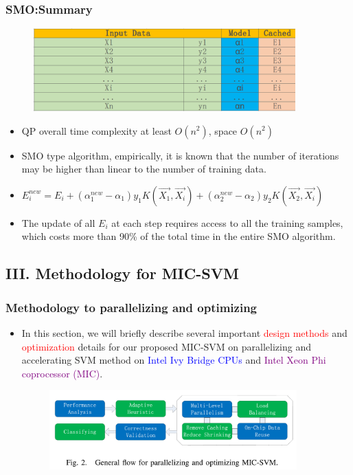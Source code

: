 \documentclass{beamer}
\begin{document}
\begin{frame}
	\frametitle{SMO:Summary}	
	\begin{figure}
		\includegraphics[width=0.9\textwidth]{figs/smo_datastructure.png}
		
	\end{figure} 
	\begin{itemize}
		\item QP overall time complexity at least $O(n^{2})$, space $O(n^{2})$
		\item SMO type algorithm, empirically, it is known that the number of iterations may be higher than
		linear to the number of training data.
		\item $E_{i}^{new} = E_i + (\alpha_{1}^{new}-\alpha_1)y_1K(\vec{X_1},\vec{X_i}) + (\alpha_{2}^{new}-\alpha_2)y_2K(\vec{X_2},\vec{X_i})$
		\item The update of all $E_i$ at each
		step requires access to all the training samples, which costs more
		than 90\% of the total time in the entire SMO algorithm. 
		
		
	\end{itemize}
\end{frame}

\subsection{III. Methodology for MIC-SVM}

\begin{frame}
	\frametitle{Methodology to parallelizing and optimizing}
	\begin{itemize}
	\item In this section, we will briefly describe several important \textcolor{red}{design
	methods} and \textcolor{red}{optimization} details for our proposed MIC-SVM on
	parallelizing and accelerating SVM method on \textcolor{blue}{Intel Ivy Bridge CPUs}
	and \textcolor{purple}{Intel Xeon Phi coprocessor (MIC)}. 
		\begin{figure}
			\includegraphics[width=0.9\textwidth]{figs/fig2_methodology.png}
		\end{figure} 
	\end{itemize}	
\end{frame}
\end{document}
